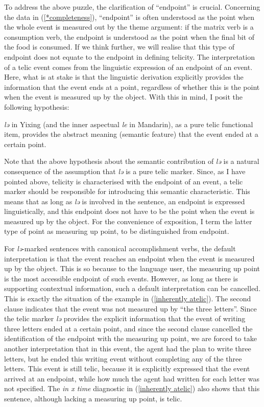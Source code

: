 \documentclass[output=paper]{langsci/langscibook}
\begin{document}
To address the above puzzle, the clarification of ``endpoint'' is crucial.
Concerning the data in (\ref{*completeness}), ``endpoint'' is often understood as
the point when the whole event is measured out by the theme argument: if the
matrix verb is a consumption verb, the endpoint is understood as the point when
the final bit of the food is consumed. If we think further, we will realise
that this type of endpoint does not equate to the endpoint in defining
telicity.  The interpretation of a telic event comes from the linguistic
expression of an endpoint of an event. Here, what is at stake is that the
linguistic derivation explicitly provides the information that the event ends
at a point, regardless of whether this is the point when the event is measured
up by the object. With this in mind, I posit the following hypothesis:

\begin{exe}
\ex\label{le hypothesis} \emph{lə} in Yixing (and the inner aspectual \emph{le} in Mandarin), as a pure telic functional item, provides the abstract meaning (semantic feature) that the event ended at a certain point.
\end{exe}

Note that the above hypothesis about the semantic contribution of \emph{lə} is a natural consequence of the assumption that \emph{lə} is a pure telic marker. Since, as I have pointed above, telicity is characterised with the endpoint of an event, a telic marker should be responsible for introducing this semantic characteristic. This means that as long as \emph{lə} is involved in the sentence, an endpoint is expressed linguistically, and this endpoint does not have to be the point when the event is measured up by the object. For the convenience of exposition, I term the latter type of point as measuring up point, to be distinguished from endpoint.

For \emph{lə}-marked sentences with canonical accomplishment verbs, the default
interpretation is that the event reaches an endpoint when the event is measured
up by the object. This is so because to the language user, the measuring up
point is the most accessible endpoint of such events. However, as long as there
is supporting contextual information, such a default interpretation can be
cancelled. This is exactly the situation of the example in (\ref{inherently
atelic}). The second clause indicates that the event was not measured up by
\enquote{the three letters}. Since the telic marker \emph{lə} provides the explicit
information that the event of writing three letters ended at a certain point,
and since the second clause cancelled the identification of the endpoint with
the measuring up point, we are forced to take another interpretation that in
this event, the agent had the plan to write three letters, but he ended this
writing event without completing any of the three letters. This event is still
telic, because it is explicitly expressed that the event arrived at an
endpoint, while how much the agent had written for each letter was not
specified. The \emph{in x time} diagnostic in (\ref{inherently atelic}) also
shows that this sentence, although lacking a measuring up point, is telic.
\end{document}
